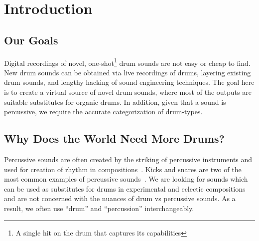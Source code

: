 \documentclass[\main/thesis.tex]{subfiles}
\begin{document}
\chapter{Introduction}


\section{Our Goals}
Digital recordings of novel, one-shot\footnote{A single hit on the drum that captures its capabilities} drum sounds are not easy or cheap to find. New drum sounds can be obtained via live recordings of drums, layering existing drum sounds, and lengthy hacking of sound engineering techniques. The goal here is to create a virtual source of novel drum sounds, where most of the outputs are suitable substitutes for organic drums. In addition, given that a sound is percussive, we require the accurate categorization of drum-types.




\section{Why Does the World Need More Drums?}
Percussive sounds are often created by the striking of percussive instruments and used for creation of rhythm in compositions~\cite{needham1967percussion}. Kicks and snares are two of the most common examples of percussive sounds~\cite{barry2005drum}. We are looking for sounds which can be used as substitutes for drums in experimental and eclectic compositions and are not concerned with the nuances of drum vs percussive sounds. As a result, we often use \enquote{drum} and \enquote{percussion} interchangeably.
\end{document}
